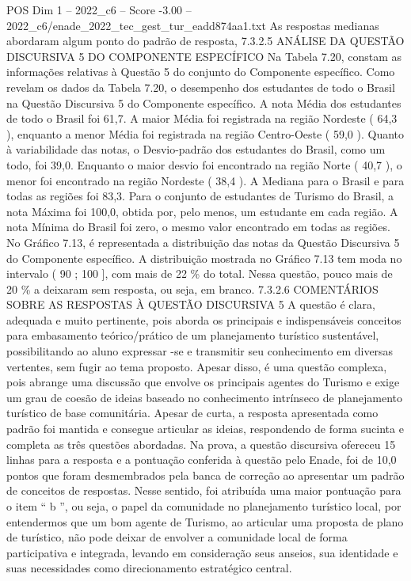 \begin{textsample}{POS Dim 1 – 2022\_c6 – Score -3.00 – 2022\_c6/enade\_2022\_tec\_gest\_tur\_eadd874aa1.txt}
As respostas medianas abordaram algum ponto do padrão de resposta, 7.3.2.5 ANÁLISE DA QUESTÃO DISCURSIVA 5 DO COMPONENTE ESPECÍFICO Na Tabela 7.20, constam as informações relativas à Questão 5 do conjunto do Componente específico.
Como revelam os dados da Tabela 7.20, o desempenho dos estudantes de todo o Brasil na Questão Discursiva 5 do Componente específico.
A nota Média dos estudantes de todo o Brasil foi 61,7.
A maior Média foi registrada na região Nordeste ( 64,3 ), enquanto a menor Média foi registrada na região Centro-Oeste ( 59,0 ).
Quanto à variabilidade das notas, o Desvio-padrão dos estudantes do Brasil, como um todo, foi 39,0.
Enquanto o maior desvio foi encontrado na região Norte ( 40,7 ), o menor foi encontrado na região Nordeste ( 38,4 ).
A Mediana para o Brasil e para todas as regiões foi 83,3.
Para o conjunto de estudantes de Turismo do Brasil, a nota Máxima foi 100,0, obtida por, pelo menos, um estudante em cada região.
A nota Mínima do Brasil foi zero, o mesmo valor encontrado em todas as regiões.
No Gráfico 7.13, é representada a distribuição das notas da Questão Discursiva 5 do Componente específico.
A distribuição mostrada no Gráfico 7.13 tem moda no intervalo ( 90 ; 100 ], com mais de 22 \% do total.
Nessa questão, pouco mais de 20 \% a deixaram sem resposta, ou seja, em branco. 7.3.2.6 COMENTÁRIOS SOBRE AS RESPOSTAS À QUESTÃO DISCURSIVA 5 A questão é clara, adequada e muito pertinente, pois aborda os principais e indispensáveis conceitos para embasamento teórico/prático de um planejamento turístico sustentável, possibilitando ao aluno expressar -se e transmitir seu conhecimento em diversas vertentes, sem fugir ao tema proposto.
Apesar disso, é uma questão complexa, pois abrange uma discussão que envolve os principais agentes do Turismo e exige um grau de coesão de ideias baseado no conhecimento intrínseco de planejamento turístico de base comunitária.
Apesar de curta, a resposta apresentada como padrão foi mantida e consegue articular as ideias, respondendo de forma sucinta e completa as três questões abordadas.
Na prova, a questão discursiva ofereceu 15 linhas para a resposta e a pontuação conferida à questão pelo Enade, foi de 10,0 pontos que foram desmembrados pela banca de correção ao apresentar um padrão de conceitos de respostas.
Nesse sentido, foi atribuída uma maior pontuação para o item “ b ”, ou seja, o papel da comunidade no planejamento turístico local, por entendermos que um bom agente de Turismo, ao articular uma proposta de plano de turístico, não pode deixar de envolver a comunidade local de forma participativa e integrada, levando em consideração seus anseios, sua identidade e suas necessidades como direcionamento estratégico central.

\end{textsample}

